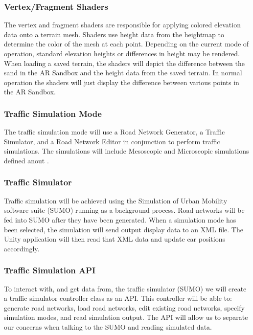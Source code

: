 \documentclass[letterpaper, 10pt, onecolumn, draftclsnofoot]{IEEEtran}
\begin{document}
        \subsubsection{Vertex/Fragment Shaders}
            The vertex and fragment shaders are responsible for applying colored elevation data onto a terrain mesh. Shaders use height data from the heightmap to determine the color of the mesh at each point. Depending on the current mode of operation, standard elevation heights or differences in height may be rendered. When loading a saved terrain, the shaders will depict the difference between the sand in the AR Sandbox and the height data from the saved terrain. In normal operation the shaders will just display the difference between various points in the AR Sandbox.
       
        \subsubsection{Traffic Simulation Mode}
            The traffic simulation mode will use a Road Network Generator, a Traffic Simulator, and a Road Network Editor in conjunction to perform traffic simulations. The simulations will include Mesoscopic and Microscopic simulations defined anout .  
        
        \subsubsection{Traffic Simulator}
            Traffic simulation will be achieved using the Simulation of Urban Mobility software suite (SUMO) running as a background process. Road networks will be fed into SUMO after they have been generated. When a simulation mode has been selected, the simulation will send output display data to an XML file. The Unity application will then read that XML data and update car positions accordingly.
       
        \subsubsection{Traffic Simulation API}
            To interact with, and get data from, the traffic simulator (SUMO) we will create a traffic simulator controller class as an API. This controller will be able to: generate road networks, load road networks, edit existing road networks, specify simulation modes, and read simulation output. The API will allow us to separate our concerns when talking to the SUMO and reading simulated data.
       
\end{document}
